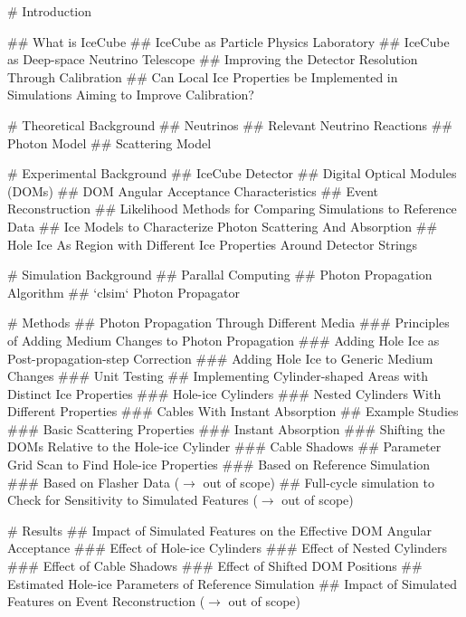
\tableofcontents

# Introduction

## What is IceCube
## IceCube as Particle Physics Laboratory
## IceCube as Deep-space Neutrino Telescope
## Improving the Detector Resolution Through Calibration
## Can Local Ice Properties be Implemented in Simulations Aiming to Improve Calibration?

# Theoretical Background
## Neutrinos
## Relevant Neutrino Reactions
## Photon Model
## Scattering Model

# Experimental Background
## IceCube Detector
## Digital Optical Modules (DOMs)
## DOM Angular Acceptance Characteristics
## Event Reconstruction
## Likelihood Methods for Comparing Simulations to Reference Data
## Ice Models to Characterize Photon Scattering And Absorption
## Hole Ice As Region with Different Ice Properties Around Detector Strings

# Simulation Background
## Parallal Computing
## Photon Propagation Algorithm
## `clsim` Photon Propagator

# Methods
## Photon Propagation Through Different Media
### Principles of Adding Medium Changes to Photon Propagation
### Adding Hole Ice as Post-propagation-step Correction
### Adding Hole Ice to Generic Medium Changes
### Unit Testing
## Implementing Cylinder-shaped Areas with Distinct Ice Properties
### Hole-ice Cylinders
### Nested Cylinders With Different Properties
### Cables With Instant Absorption
## Example Studies
### Basic Scattering Properties
### Instant Absorption
### Shifting the DOMs Relative to the Hole-ice Cylinder
### Cable Shadows
## Parameter Grid Scan to Find Hole-ice Properties
### Based on Reference Simulation
### Based on Flasher Data ($\rightarrow$ out of scope)
## Full-cycle simulation to Check for Sensitivity to Simulated Features ($\rightarrow$ out of scope)

# Results
## Impact of Simulated Features on the Effective DOM Angular Acceptance
### Effect of Hole-ice Cylinders
### Effect of Nested Cylinders
### Effect of Cable Shadows
### Effect of Shifted DOM Positions
## Estimated Hole-ice Parameters of Reference Simulation
## Impact of Simulated Features on Event Reconstruction ($\rightarrow$ out of scope)

